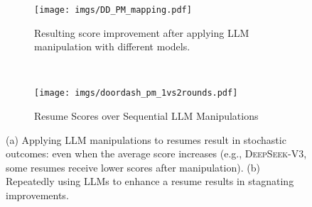 \begin{figure*}[ht]
    \centering
        \centering
    \begin{subfigure}[t]{0.6\textwidth}
        \centering
        \texttt{[image: imgs/DD\_PM\_mapping.pdf]}
        \caption{Resulting score improvement after applying LLM manipulation with different models.}
        \label{fig:mapping}
    \end{subfigure}
    ~
    \begin{subfigure}[t]{0.35\textwidth}
        \centering
        \texttt{[image: imgs/doordash\_pm\_1vs2rounds.pdf]}
        \caption{Resume Scores over Sequential LLM Manipulations}
        \label{fig:two-rounds}
    \end{subfigure}%
    \caption{(a) Applying LLM manipulations to resumes result in stochastic outcomes: even when the average score increases (e.g., \textsc{DeepSeek-V3}, some resumes receive lower scores after manipulation). (b) Repeatedly using LLMs to enhance a resume results in stagnating improvements.}
    \label{fig:observations-a-c}
\end{figure*}


